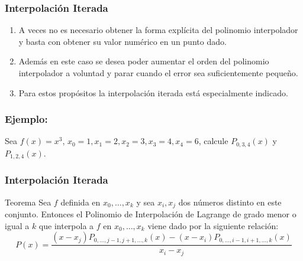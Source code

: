 \documentclass{beamer}
\begin{document}
{
\frametitle{Interpolaci\'on Iterada}
\begin{enumerate}
 \item<1-> A veces no es necesario obtener la forma expl\'icita del polinomio interpolador y basta con obtener su valor num\'erico 
 en un punto dado. 
 \item<2-> Adem\'as en este caso se desea poder aumentar el orden del polinomio interpolador a voluntad y parar 
 cuando el error sea suficientemente peque\~no. 
 \item<3-> Para estos prop\'ositos la interpolaci\'on iterada est\'a especialmente 
 indicado. 
\end{enumerate}
}
\frame
{
\frametitle{Ejemplo:}
Sea $f(x) = x^3$, $x_0 = 1, x_1 = 2, x_2 = 3, x_3 = 4, x_4 = 6$, calcule $P_{0,3,4}(x)$ y 
$P_{1,2,4}(x)$.
}
\frame
{
\frametitle{Interpolaci\'on Iterada}
\begin{block}{Teorema}
  Sea $f$ definida en $x_0,\ldots,x_k$ y sea $x_i,x_j$ dos n\'umeros distinto en este conjunto. Entonces el Polinomio de 
 Interpolaci\'on de Lagrange de grado menor o igual a $k$ que interpola a $f$ en $x_0,\ldots,x_k$ viene dado por la 
 siguiente relaci\'on:
 $$
 P(x) = \dfrac{(x-x_j)P_{0,\ldots,j-1,j+1,\ldots,k}(x) - (x-x_i)P_{0,\ldots,i-1,i+1,\ldots,k}(x)}{x_i - x_j}
 $$
 \end{block}
}
\end{document}

